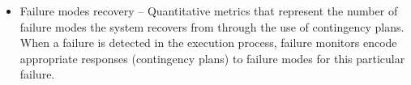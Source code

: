 \begin{itemize}
\item \sf Failure modes recovery \rm -- Quantitative metrics that represent the number of failure modes the system recovers from through the use of contingency plans. When a failure is detected in the execution process, failure monitors encode appropriate responses (contingency plans) to failure modes for this particular failure.\\

\end{itemize}
